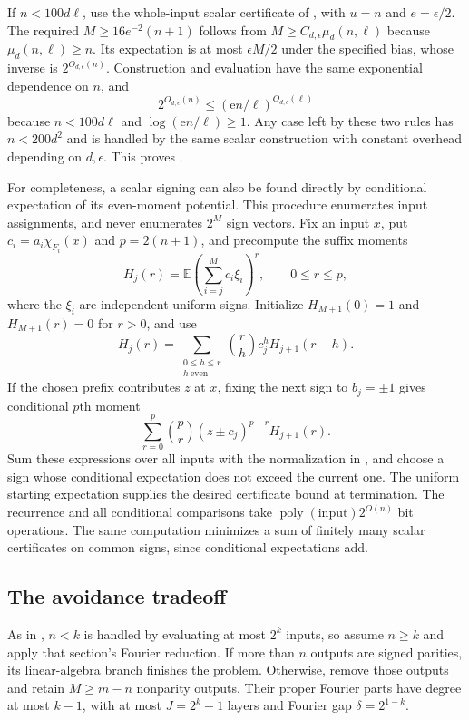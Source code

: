 \documentclass[letterpaper,11pt]{article}
\theoremstyle{definition}
\newcommand{\E}{\mathbb E}
\DeclareMathOperator{\poly}{poly}
\begin{document}
If $n<100d\ell$, use the whole-input scalar certificate of
, with $u=n$ and $e=\epsilon/2$.
The required $M\geq16e^{-2}(n+1)$ follows from
$M\geq C_{d,\epsilon}\mu_d(n,\ell)$ because $\mu_d(n,\ell)\geq n$.
Its expectation is at most $\epsilon M/2$ under the specified bias,
whose inverse is $2^{O_{d,\epsilon}(n)}$.
Construction and evaluation have the same exponential dependence on
$n$, and
\[
 2^{O_{d,\epsilon}(n)}
 \leq(\mathrm e n/\ell)^{O_{d,\epsilon}(\ell)}
\]
because $n<100d\ell$ and $\log(\mathrm e n/\ell)\geq1$.
Any case left by these two rules has $n<200d^2$ and is handled by
the same scalar construction with constant overhead depending on
$d,\epsilon$. This proves .

For completeness, a scalar signing can also be found directly by
conditional expectation of its even-moment potential. This procedure
enumerates input assignments, and never enumerates $2^M$ sign vectors.
Fix an input $x$, put $c_i=a_i\chi_{F_i}(x)$ and $p=2(n+1)$, and
precompute the suffix moments
\[
 H_j(r)=\E\left(\sum_{i=j}^M c_i\xi_i\right)^r,
 \qquad 0\leq r\leq p,
\]
where the $\xi_i$ are independent uniform signs. Initialize
$H_{M+1}(0)=1$ and $H_{M+1}(r)=0$ for $r>0$, and use
\begin{equation}\label{hierarchy:moment-recurrence}
 H_j(r)=\sum_{\substack{0\leq h\leq r\\h\ \mathrm{even}}}
         \binom rh c_j^h H_{j+1}(r-h).
\end{equation}
If the chosen prefix contributes $z$ at $x$, fixing the next sign to
$b_j=\pm1$ gives conditional $p$th moment
\[
 \sum_{r=0}^p\binom pr(z\pm c_j)^{p-r}H_{j+1}(r).
\]
Sum these expressions over all inputs with the normalization in
, and choose a sign whose conditional expectation
does not exceed the current one. The uniform starting expectation
supplies the desired certificate bound at termination.
The recurrence and all conditional comparisons take
$\poly(\text{input})2^{O(n)}$ bit operations. The same computation
minimizes a sum of finitely many scalar certificates on common signs,
since conditional expectations add.

\subsection{The avoidance tradeoff}

As in , $n<k$ is handled by evaluating at most
$2^k$ inputs, so assume $n\geq k$ and apply that section's Fourier
reduction. If more than $n$
outputs are signed parities, its linear-algebra branch finishes the
problem. Otherwise, remove those outputs and retain $M\geq m-n$
nonparity outputs. Their proper Fourier parts have degree at most
$k-1$, with at most $J=2^k-1$ layers and Fourier gap
$\delta=2^{1-k}$.
\end{document}
